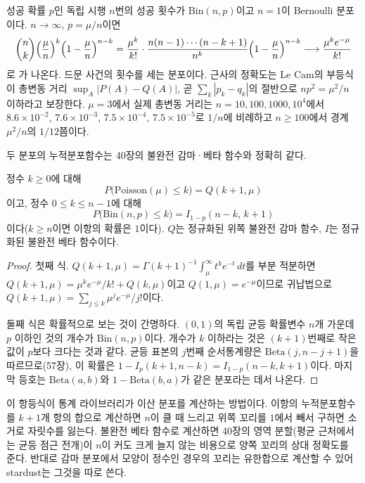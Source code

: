 성공 확률 $p$인 독립 시행 $n$번의 성공 횟수가  $\mathrm{Bin}(n,p)$이고 $n=1$이 Bernoulli 분포이다. $n\to\infty$, $p=\mu/n$이면
\[
\binom nk\Bigl(\frac\mu n\Bigr)^k\Bigl(1-\frac\mu n\Bigr)^{n-k}=\frac{\mu^k}{k!}\cdot\frac{n(n-1)\cdots(n-k+1)}{n^k}\Bigl(1-\frac\mu n\Bigr)^{n-k}\longrightarrow\frac{\mu^ke^{-\mu}}{k!}
\]
로 가 나온다. 드문 사건의 횟수를 세는 분포이다. 근사의 정확도는 Le Cam의 부등식\cite{lecam1960}이 총변동 거리 $\sup_A|P(A)-Q(A)|$, 곧 $\sum_k|p_k-q_k|$의 절반으로 $np^2=\mu^2/n$ 이하라고 보장한다. $\mu=3$에서 실제 총변동 거리는 $n=10,100,1000,10^4$에서 $8.6\times10^{-2}$, $7.6\times10^{-3}$, $7.5\times10^{-4}$, $7.5\times10^{-5}$로 $1/n$에 비례하고 $n\ge100$에서 경계 $\mu^2/n$의 $1/12$쯤이다.

두 분포의 누적분포함수는 40장의 불완전 감마·베타 함수와 정확히 같다.

\begin{proposition}
\label{prop:cdf-identities}
정수 $k\ge0$에 대해
\[
P\bigl(\mathrm{Poisson}(\mu)\le k\bigr)=Q(k+1,\mu)
\]
이고, 정수 $0\le k\le n-1$에 대해
\[
P\bigl(\mathrm{Bin}(n,p)\le k\bigr)=I_{1-p}(n-k,\,k+1)
\]
이다($k\ge n$이면 이항의 확률은 $1$이다). $Q$는 정규화된 위쪽 불완전 감마 함수, $I$는 정규화된 불완전 베타 함수이다.
\end{proposition}

\begin{proof}
첫째 식. $Q(k+1,\mu)=\Gamma(k+1)^{-1}\int_\mu^\infty t^ke^{-t}\,dt$를 부분 적분하면 $Q(k+1,\mu)=\mu^ke^{-\mu}/k!+Q(k,\mu)$이고 $Q(1,\mu)=e^{-\mu}$이므로 귀납법으로 $Q(k+1,\mu)=\sum_{j\le k}\mu^je^{-\mu}/j!$이다.

둘째 식은 확률적으로 보는 것이 간명하다. $(0,1)$의 독립 균등 확률변수 $n$개 가운데 $p$ 이하인 것의 개수가 $\mathrm{Bin}(n,p)$이다. 개수가 $k$ 이하라는 것은 $(k+1)$번째로 작은 값이 $p$보다 크다는 것과 같다. 균등 표본의 $j$번째 순서통계량은 $\mathrm{Beta}(j,n-j+1)$을 따르므로(57장), 이 확률은 $1-I_p(k+1,n-k)=I_{1-p}(n-k,k+1)$이다. 마지막 등호는 $\mathrm{Beta}(a,b)$와 $1-\mathrm{Beta}(b,a)$가 같은 분포라는 데서 나온다.
\end{proof}

이 항등식이 통계 라이브러리가 이산 분포를 계산하는 방법이다. 이항의 누적분포함수를 $k+1$개 항의 합으로 계산하면 $n$이 클 때 느리고 위쪽 꼬리를 $1$에서 빼서 구하면 소거로 자릿수를 잃는다. 불완전 베타 함수로 계산하면 40장의 영역 분할(평균 근처에서는 균등 점근 전개)이 $n$이 커도 크게 늘지 않는 비용으로 양쪽 꼬리의 상대 정확도를 준다. 반대로 감마 분포에서 모양이 정수인 경우의 꼬리는 유한합으로 계산할 수 있어 stardust는 그것을 따로 쓴다.

